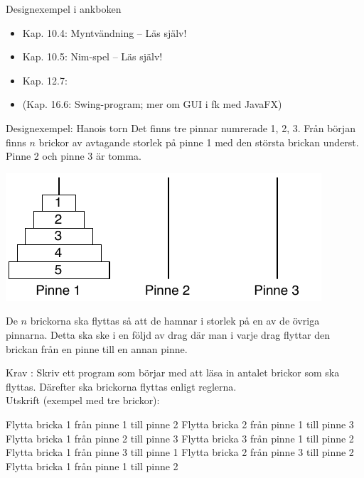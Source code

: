 \documentclass{lecturenotes}
\begin{document}
\begin{Slide}{Designexempel i ankboken}
\begin{itemize}
\item Kap. 10.4: Myntvändning  -- Läs själv!
\item Kap. 10.5: Nim-spel -- Läs själv!
\item Kap. 12.7:   
\item (Kap. 16.6:  Swing-program; mer om GUI i fk med JavaFX)
\end{itemize}
\end{Slide}

\begin{Slide}{Designexempel: Hanois torn}
Det finns tre pinnar numrerade 1, 2, 3. Från början finns $n$ brickor av avtagande storlek på pinne 1 med den största brickan underst. Pinne 2 och pinne 3 är tomma.
\begin{center}
\includegraphics[scale=0.9]{img/hanoi-init.pdf}
\end{center}
De $n$ brickorna ska flyttas så att de hamnar i  storlek på en av de övriga pinnarna. Detta ska ske i en följd av drag där man i varje drag flyttar den  brickan från en pinne till en annan pinne. 
\end{Slide} 

\begin{Slide}{Krav}
: Skriv ett program som börjar med att läsa in antalet brickor som ska flyttas. Därefter ska brickorna flyttas enligt reglerna. \\ \vspace{1em}Utskrift (exempel med tre brickor):
\begin{Code}
Flytta bricka 1 från pinne 1 till pinne 2
Flytta bricka 2 från pinne 1 till pinne 3
Flytta bricka 1 från pinne 2 till pinne 3
Flytta bricka 3 från pinne 1 till pinne 2
Flytta bricka 1 från pinne 3 till pinne 1
Flytta bricka 2 från pinne 3 till pinne 2
Flytta bricka 1 från pinne 1 till pinne 2
\end{Code}
\end{Slide} 
\end{document}
